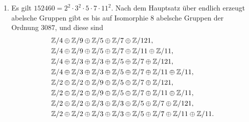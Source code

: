 \begin{solution}
\begin{enumerate}
    \item
      Es gilt $152460 = 2^2 \cdot 3^2 \cdot 5 \cdot 7 \cdot 11^2$.
      Nach dem Hauptsatz über endlich erzeugt abelsche Gruppen gibt es bis auf Isomorphie $8$ abelsche Gruppen der Ordnung $3087$, und diese sind
      \begin{align*}
        &\, \mathbb{Z}/4 \oplus \mathbb{Z}/9 \oplus \mathbb{Z}/5 \oplus \mathbb{Z}/7 \oplus \mathbb{Z}/121,
        \\
        &\,\mathbb{Z}/4 \oplus \mathbb{Z}/9 \oplus \mathbb{Z}/5 \oplus \mathbb{Z}/7 \oplus \mathbb{Z}/11 \oplus \mathbb{Z}/11,
        \\
        &\,\mathbb{Z}/4 \oplus \mathbb{Z}/3 \oplus \mathbb{Z}/3 \oplus \mathbb{Z}/5 \oplus \mathbb{Z}/7 \oplus \mathbb{Z}/121,
        \\
        &\,\mathbb{Z}/4 \oplus \mathbb{Z}/3 \oplus \mathbb{Z}/3 \oplus \mathbb{Z}/5 \oplus \mathbb{Z}/7 \oplus \mathbb{Z}/11 \oplus \mathbb{Z}/11,
        \\
        &\,\mathbb{Z}/2 \oplus \mathbb{Z}/2 \oplus \mathbb{Z}/9 \oplus \mathbb{Z}/5 \oplus \mathbb{Z}/7 \oplus \mathbb{Z}/121,
        \\
        &\,\mathbb{Z}/2 \oplus \mathbb{Z}/2 \oplus \mathbb{Z}/9 \oplus \mathbb{Z}/5 \oplus \mathbb{Z}/7 \oplus \mathbb{Z}/11 \oplus \mathbb{Z}/11,
        \\
        &\,\mathbb{Z}/2 \oplus \mathbb{Z}/2 \oplus \mathbb{Z}/3 \oplus \mathbb{Z}/3 \oplus \mathbb{Z}/5 \oplus \mathbb{Z}/7 \oplus \mathbb{Z}/121,
        \\
        &\,\mathbb{Z}/2 \oplus \mathbb{Z}/2 \oplus \mathbb{Z}/3 \oplus \mathbb{Z}/3 \oplus \mathbb{Z}/5 \oplus \mathbb{Z}/7 \oplus \mathbb{Z}/11 \oplus \mathbb{Z}/11.
      \end{align*}
  \end{enumerate}
\end{solution}


